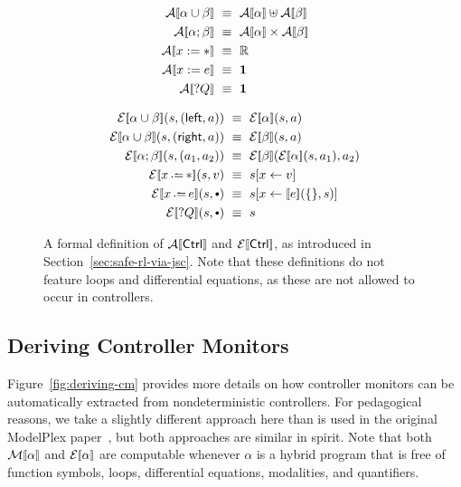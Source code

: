 \documentclass[acmsmall,screen,nonacm]{acmart}
\begin{document}
\begin{figure}
  \begin{minipage}{0.4\textwidth}
  \begin{align*}
      \CtrlActionSem{\alpha \cup \beta} &\ \equiv \ \CtrlActionSem{\alpha} \uplus \CtrlActionSem{\beta} \\
      \CtrlActionSem{\alpha ; \beta} &\ \equiv \ \CtrlActionSem{\alpha} \times \CtrlActionSem{\beta} \\
      \CtrlActionSem{x := *} &\ \equiv \ \Reals \\
      \CtrlActionSem{x := e} &\ \equiv \ \UnitSet \\
      \CtrlActionSem{?Q} &\ \equiv \ \UnitSet \\
  \end{align*}
  \end{minipage}
  \begin{minipage}{0.5\textwidth}
  \begin{align*}
      \CtrlExeSem{\alpha \cup \beta}(s, \SumLeftInj{a}) & \ \equiv \ \CtrlExeSem{\alpha}(s, a) \\
      \CtrlExeSem{\alpha \cup \beta}(s, \SumRightInj{a}) & \ \equiv \ \CtrlExeSem{\beta}(s, a) \\
      \CtrlExeSem{\alpha ; \beta}(s, (a_1, a_2)) & \ \equiv \ \CtrlExeSem{\beta}(\CtrlExeSem{\alpha}(s, a_1), a_2) \\
      \CtrlExeSem{x \dlassign *}(s, v) & \ \equiv \ \UpdateMap{s}{x}{v} \\
      \CtrlExeSem{x \dlassign e}(s, \Unit) & \ \equiv \ \UpdateMap{s}{x}{\sem{e}(\EmptyValuation, s)} \\
      \CtrlExeSem{?Q}(s, \Unit) & \ \equiv \ s
  \end{align*}
  \end{minipage}
  \caption{A formal definition of $\CtrlActionSem{\Ctrl}$ and $\CtrlExeSem{\Ctrl}$, as introduced in Section~\ref{sec:safe-rl-via-jsc}. Note that these definitions do not feature loops and differential equations, as these are not allowed to occur in controllers.}
  \Description[]{}
  \label{fig:ctrl-fun-sem}
\end{figure}

\subsection{Deriving Controller Monitors}
\label{ap:extracting-cm}
Figure~\ref{fig:deriving-cm} provides more details on how controller monitors can be automatically extracted from nondeterministic controllers. For pedagogical reasons, we take a slightly different approach here than is used in the original ModelPlex paper~\cite{DBLP:journals/fmsd/MitschP16}, but both approaches are similar in spirit. Note that both $\CtrlMonitorSem{\alpha}$ and $\CtrlExeSem{\alpha}$ are computable whenever $\alpha$ is a hybrid program that is free of function symbols, loops, differential equations, modalities, and quantifiers.
\end{document}
